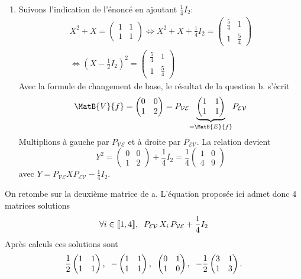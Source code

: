 \begin{enumerate}
 \item Suivons l'indication de l'énoncé en ajoutant $\frac{1}{4}I_2$:
\begin{multline*}
  X^2 + X = \begin{pmatrix} 1 & 1 \\ 1 & 1 \end{pmatrix}
  \Leftrightarrow
  X^2 + X + \frac{1}{4}I_2 = \begin{pmatrix} \frac{5}{4} & 1 \\ 1 & \frac{5}{4} \end{pmatrix}\\
  \Leftrightarrow
  (X - \frac{1}{2}I_2)^2 = \begin{pmatrix} \frac{5}{4} & 1 \\ 1 & \frac{5}{4} \end{pmatrix}
\end{multline*}
Avec la formule de changement de base, le résultat de la question b. s'écrit
\[
\MatB{V}{f}=
\begin{pmatrix} 0 & 0 \\ 1 & 2 \end{pmatrix}
 = P_{\mathcal{V}\mathcal{E}} \underset{= \MatB{E}{f}}{\underbrace{\begin{pmatrix} 1 & 1 \\ 1 & 1 \end{pmatrix}}}P_{\mathcal{E}\mathcal{V}} 
\]
Multiplions à gauche par $P_{\mathcal{V}\mathcal{E}}$ et à droite par $P_{\mathcal{E}\mathcal{V}}$. La relation devient
\[
  Y^2 = \begin{pmatrix} 0 & 0 \\ 1 & 2 \end{pmatrix} + \frac{1}{4} I_2 = \frac{1}{4}\begin{pmatrix} 1 & 0 \\ 4 & 9 \end{pmatrix}  
\]
avec $Y = P_{\mathcal{V}\mathcal{E}} X P_{\mathcal{E}\mathcal{V}} - \frac{1}{4}I_2$.
\end{enumerate}
On retombe sur la deuxième matrice de a. L'équation proposée ici admet donc 4 matrices solutions
\[
  \forall i \in \llbracket 1,4 \rrbracket, \hspace{0.2cm} P_{\mathcal{E}\mathcal{V}}\, X_i\, P_{\mathcal{V}\mathcal{E}} + \frac{1}{4} I_2
\]
Après calculs ces solutions sont
\[
  \frac{1}{2}\begin{pmatrix} 1 & 1 \\ 1 & 1 \end{pmatrix},\hspace{0.2cm}
  -\begin{pmatrix} 1 & 1 \\ 1 & 1 \end{pmatrix},\hspace{0.2cm}
  \begin{pmatrix} 0 & 1 \\ 1 & 0 \end{pmatrix},\hspace{0.2cm}
  -\frac{1}{2}\begin{pmatrix} 3 & 1 \\ 1 & 3 \end{pmatrix}.
\]

